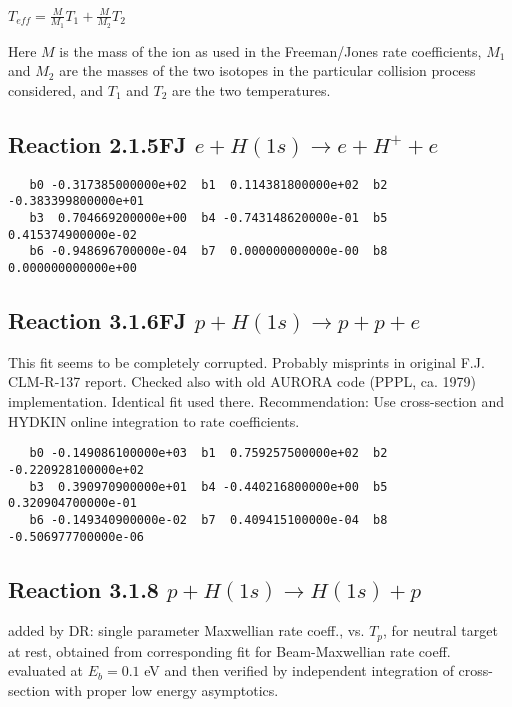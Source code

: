 \documentclass[12pt,dvipdfmx]{article}
\begin{document}
$T_{eff} = \frac {M}{M_1} T_1 + \frac{M}{M_2} T_2 $

Here $M$ is the mass of the ion as used in the Freeman/Jones rate coefficients,
$M_1$ and $M_2$ are the masses of the two isotopes in the particular collision
process considered, and $T_1$ and $T_2$ are the two temperatures.

\bigskip

\subsection{
Reaction 2.1.5FJ  $e + H(1s) \rightarrow e + H^+ + e$
}


\begin{small}\begin{verbatim}
   b0 -0.317385000000e+02  b1  0.114381800000e+02  b2 -0.383399800000e+01
   b3  0.704669200000e+00  b4 -0.743148620000e-01  b5  0.415374900000e-02
   b6 -0.948696700000e-04  b7  0.000000000000e-00  b8  0.000000000000e+00
\end{verbatim}\end{small}

\subsection{
Reaction 3.1.6FJ  $p + H(1s) \rightarrow p + p + e $
}
This fit seems to be completely corrupted. Probably misprints in original F.J. CLM-R-137 report.
Checked also with old AURORA code (PPPL, ca. 1979) implementation. Identical fit used there.
Recommendation: Use cross-section and HYDKIN online integration to rate coefficients.

\begin{small}\begin{verbatim}
   b0 -0.149086100000e+03  b1  0.759257500000e+02  b2 -0.220928100000e+02
   b3  0.390970900000e+01  b4 -0.440216800000e+00  b5  0.320904700000e-01
   b6 -0.149340900000e-02  b7  0.409415100000e-04  b8 -0.506977700000e-06
\end{verbatim}\end{small}

\subsection{
Reaction 3.1.8 $  p + H(1s) \rightarrow H(1s) + p$}

added by DR: single parameter Maxwellian rate coeff., vs. $T_p$, for neutral target at rest,
obtained from corresponding fit for Beam-Maxwellian rate coeff. evaluated at $E_b =0.1$ eV
and then verified by independent integration of cross-section with proper low energy asymptotics.
\end{document}
